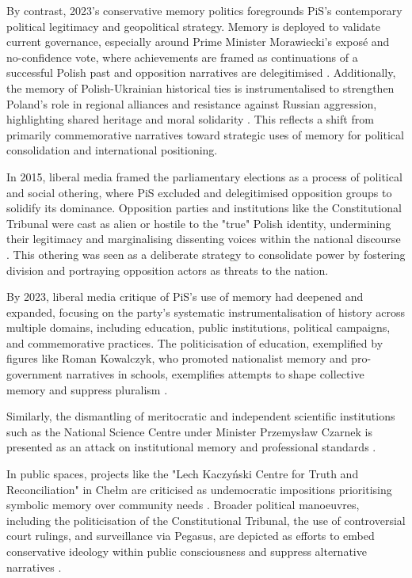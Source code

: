 By contrast, 2023's conservative memory politics foregrounds PiS's contemporary political legitimacy and geopolitical strategy. Memory is deployed to validate current governance, especially around Prime Minister Morawiecki's exposé and no-confidence vote, where achievements are framed as continuations of a successful Polish past and opposition narratives are delegitimised \citep{wpolityce_relacja_2023}. Additionally, the memory of Polish-Ukrainian historical ties is instrumentalised to strengthen Poland's role in regional alliances and resistance against Russian aggression, highlighting shared heritage and moral solidarity \citep{wpolityce_wszystkie_2023}. This reflects a shift from primarily commemorative narratives toward strategic uses of memory for political consolidation and international positioning.

In 2015, liberal media framed the parliamentary elections as a process of political and social othering, where PiS excluded and delegitimised opposition groups to solidify its dominance. Opposition parties and institutions like the Constitutional Tribunal were cast as alien or hostile to the "true" Polish identity, undermining their legitimacy and marginalising dissenting voices within the national discourse \citep{wronski_pis_2015}. This othering was seen as a deliberate strategy to consolidate power by fostering division and portraying opposition actors as threats to the nation.

By 2023, liberal media critique of PiS's use of memory had deepened and expanded, focusing on the party's systematic instrumentalisation of history across multiple domains, including education, public institutions, political campaigns, and commemorative practices. The politicisation of education, exemplified by figures like Roman Kowalczyk, who promoted nationalist memory and pro-government narratives in schools, exemplifies attempts to shape collective memory and suppress pluralism \citep{kowalczyk_pis-owska_2023}.

Similarly, the dismantling of meritocratic and independent scientific institutions such as the National Science Centre under Minister Przemysław Czarnek is presented as an attack on institutional memory and professional standards \citep{blocki_byly_2023}.

In public spaces, projects like the "Lech Kaczyński Centre for Truth and Reconciliation" in Chełm are criticised as undemocratic impositions prioritising symbolic memory over community needs \citep{brzuszkiewicz_w_2023}. Broader political manoeuvres, including the politicisation of the Constitutional Tribunal, the use of controversial court rulings, and surveillance via Pegasus, are depicted as efforts to embed conservative ideology within public consciousness and suppress alternative narratives \citep{izdebski_nierowne_2023}.

